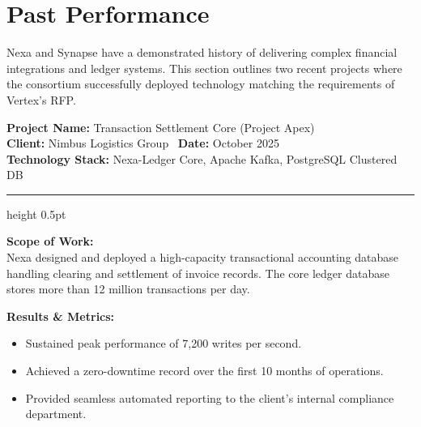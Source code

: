 \section{Past Performance}
\label{sec:past_performance}

Nexa and Synapse have a demonstrated history of delivering complex financial integrations and ledger systems. This section outlines two recent projects where the consortium successfully deployed technology matching the requirements of Vertex's RFP.

\begin{tcolorbox}[proposalbox, title=Case Study 1: Nimbus Logistics Systems]
  \textbf{Project Name:} Transaction Settlement Core (Project Apex) \\
  \textbf{Client:} Nimbus Logistics Group \textperiodcentered\ \textbf{Date:} October 2025 \\
  \textbf{Technology Stack:} Nexa-Ledger Core, Apache Kafka, PostgreSQL Clustered DB

  \medskip
  {\color{border}\hrule height 0.5pt}
  \medskip

  \textbf{Scope of Work:} \\
  Nexa designed and deployed a high-capacity transactional accounting database handling clearing and settlement of invoice records. The core ledger database stores more than 12 million transactions per day.
  
  \textbf{Results \& Metrics:}
  \begin{itemize}
    \item Sustained peak performance of 7,200 writes per second.
    \item Achieved a zero-downtime record over the first 10 months of operations.
    \item Provided seamless automated reporting to the client's internal compliance department.
  \end{itemize}
\end{tcolorbox}

